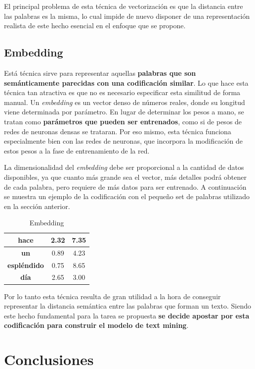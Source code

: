 \documentclass[12pt,a4paper, xcolor=table]{article}
\begin{document}
\vspace{2mm}

El principal problema de esta técnica de vectorización es que la distancia entre las palabras es la misma, lo cual impide de nuevo disponer de una representación realista de este hecho esencial en el enfoque que se propone.

\subsection{Embedding}

Está técnica sirve para representar aquellas \textbf{palabras que son semánticamente parecidas con una codificación similar}. Lo que hace esta técnica tan atractiva es que no es necesario especificar esta similitud de forma manual. Un \textit{embedding} es un vector denso de números reales, donde su longitud viene determinada por parámetro. En lugar de determinar los pesos a mano, se tratan como \textbf{parámetros que pueden ser entrenados}, como si de pesos de redes de neuronas densas se trataran. Por eso mismo, esta técnica funciona especialmente bien con las redes de neuronas, que incorpora la modificación de estos pesos a la fase de entrenamiento de la red.

\vspace{2mm}

La dimensionalidad del \textit{embedding} debe ser proporcional a la cantidad de datos disponibles, ya que cuanto más grande sea el vector, más detalles podrá obtener de cada palabra, pero requiere de más datos para ser entrenado. A continuación se muestra un ejemplo de la codificación con el pequeño set de palabras utilizado en la sección anterior.

  \begin{table}[h]
        \centering
        \begin{tabular}{|c|c|c|}
        \hline
        \textbf{hace}                     & 2.32 & 7.35 \\ \hline
        \textbf{un}                       & 0.89 & 4.23 \\ \hline
        \textbf{espléndido}               & 0.75 & 8.65 \\ \hline
        \textbf{día}                      & 2.65 & 3.00 \\ \hline
        \end{tabular}
        \caption{Embedding}
            \label{fig:graf_exp1}
    \end{table}

Por lo tanto esta técnica resulta de gran utilidad a la hora de conseguir representar la distancia semántica entre las palabras que forman un texto. Siendo este hecho fundamental para la tarea se propuesta \textbf{se decide apostar por esta codificación para construir el modelo de text mining}.
\section{Conclusiones}

\clearpage



\end{document}
